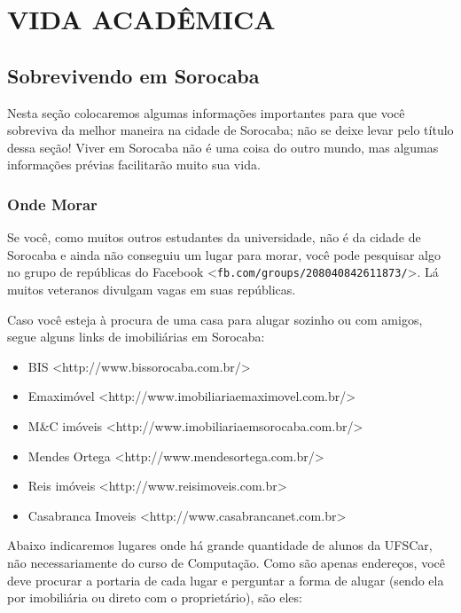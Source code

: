 \section{VIDA ACADÊMICA}
\subsection{Sobrevivendo em Sorocaba}
Nesta seção colocaremos algumas informações importantes para que você sobreviva da melhor maneira na cidade de Sorocaba; não se deixe levar pelo título dessa seção! Viver em Sorocaba não é uma coisa do outro mundo, mas algumas informações prévias facilitarão muito sua vida.

\subsubsection{Onde Morar}
Se você, como muitos outros estudantes da universidade, não é da cidade de Sorocaba e ainda não conseguiu um lugar para morar, você pode pesquisar algo no grupo de repúblicas do Facebook <\texttt{fb.com/groups/208040842611873/}>. Lá muitos veteranos divulgam vagas em suas repúblicas.

Caso você esteja à procura de uma casa para alugar sozinho ou com amigos, segue alguns  links de imobiliárias em Sorocaba:

\begin{itemize}
  \item BIS <http://www.bissorocaba.com.br/>
  \item Emaximóvel <http://www.imobiliariaemaximovel.com.br/>
  \item M\&C imóveis <http://www.imobiliariaemsorocaba.com.br/>
  \item Mendes Ortega <http://www.mendesortega.com.br/>
  \item Reis imóveis <http://www.reisimoveis.com.br>
  \item Casabranca Imoveis <http://www.casabrancanet.com.br>
\end{itemize}

Abaixo indicaremos lugares onde há grande quantidade de alunos da UFSCar, não
necessariamente do curso de Computação. Como são apenas endereços, você deve
procurar a portaria de cada lugar e perguntar a forma de alugar (sendo ela por
imobiliária ou direto com o proprietário), são eles:

